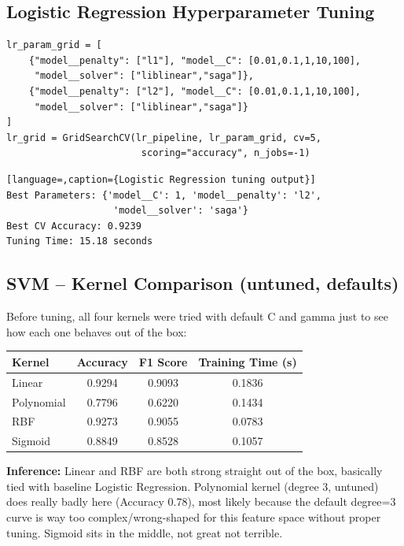 \documentclass[12pt,a4paper]{article}
\begin{document}
\subsection*{Logistic Regression Hyperparameter Tuning}
\begin{lstlisting}[caption={Search space used for Logistic Regression}]
lr_param_grid = [
    {"model__penalty": ["l1"], "model__C": [0.01,0.1,1,10,100],
     "model__solver": ["liblinear","saga"]},
    {"model__penalty": ["l2"], "model__C": [0.01,0.1,1,10,100],
     "model__solver": ["liblinear","saga"]}
]
lr_grid = GridSearchCV(lr_pipeline, lr_param_grid, cv=5,
                        scoring="accuracy", n_jobs=-1)
\end{lstlisting}
\begin{lstlisting}[language=,caption={Logistic Regression tuning output}]
Best Parameters: {'model__C': 1, 'model__penalty': 'l2',
                   'model__solver': 'saga'}
Best CV Accuracy: 0.9239
Tuning Time: 15.18 seconds
\end{lstlisting}

\subsection*{SVM -- Kernel Comparison (untuned, defaults)}
Before tuning, all four kernels were tried with default C and gamma just to see how each one behaves out of the box:
\begin{tabular}{lccc}
\toprule
Kernel & Accuracy & F1 Score & Training Time (s) \\
\midrule
Linear & 0.9294 & 0.9093 & 0.1836 \\
Polynomial & 0.7796 & 0.6220 & 0.1434 \\
RBF & 0.9273 & 0.9055 & 0.0783 \\
Sigmoid & 0.8849 & 0.8528 & 0.1057 \\
\bottomrule
\end{tabular}

\textbf{Inference:} Linear and RBF are both strong straight out of the box, basically tied with baseline Logistic Regression. Polynomial kernel (degree 3, untuned) does really badly here (Accuracy 0.78), most likely because the default degree=3 curve is way too complex/wrong-shaped for this feature space without proper tuning. Sigmoid sits in the middle, not great not terrible.
\end{document}

